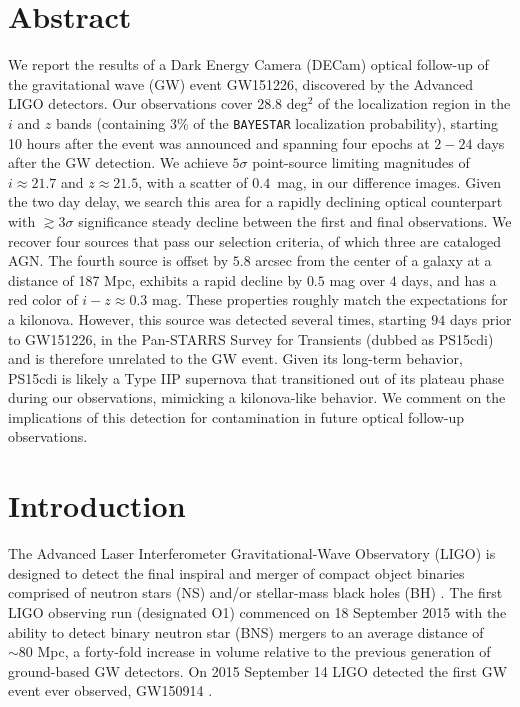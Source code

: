 
\section*{Abstract}
  We report the results of a Dark Energy Camera (DECam)
  optical follow-up of the gravitational wave (GW) event GW151226,
  discovered by the Advanced LIGO detectors. Our observations cover 28.8
  deg$^2$ of the localization region in the $i$ and $z$ bands (containing 3\%
  of the {\tt BAYESTAR} localization probability), starting 10 hours after the
  event was announced and spanning four epochs at $2-24$ days after the
  GW detection. We achieve $5\sigma$ point-source limiting
  magnitudes of $i\approx21.7$ and $z\approx21.5$, with a scatter
  of $0.4$~mag, in our difference images. Given the two day delay,
  we search this area for a rapidly declining optical counterpart with
  $\gtrsim 3\sigma$ significance steady decline between the first and final
  observations. We recover four sources that pass our selection criteria,
  of which three are cataloged AGN. The fourth source is offset
  by $5.8$ arcsec from the center of a galaxy at a distance of 187
  Mpc, exhibits a rapid decline by $0.5$ mag over $4$ days,
  and has a red color of $i-z\approx 0.3$ mag. These properties roughly match
  the expectations for a kilonova. However, this source
  was detected several times, starting $94$ days prior to GW151226,
  in the Pan-STARRS Survey for Transients (dubbed as PS15cdi) and
  is therefore unrelated to the GW event. Given its long-term
  behavior, PS15cdi is likely a Type IIP supernova that
  transitioned out of its plateau phase during our
  observations, mimicking a kilonova-like behavior. We comment on
  the implications of this detection for contamination in future
  optical follow-up observations.

\section{Introduction}
\label{sec:ch4_intro}

The Advanced Laser Interferometer Gravitational-Wave Observatory
(LIGO) is designed to detect the final inspiral and
merger of compact object binaries comprised of neutron stars (NS)
and/or stellar-mass black holes (BH) \citep{LIGOMainRef}.
The first LIGO observing run (designated O1)
commenced on 18 September 2015 with the ability to detect binary
neutron star (BNS) mergers to an average distance of $\sim 80$ Mpc, a
forty-fold increase in volume relative to the previous generation of
ground-based GW detectors. On 2015 September 14 LIGO detected
the first GW event ever observed, GW150914 \citep{LIGOGW150914}.

